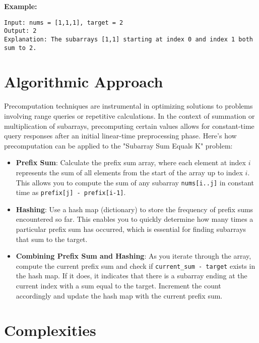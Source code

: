 \textbf{Example:}
\begin{verbatim}
Input: nums = [1,1,1], target = 2
Output: 2
Explanation: The subarrays [1,1] starting at index 0 and index 1 both sum to 2.
\end{verbatim}


\section*{Algorithmic Approach}

Precomputation techniques are instrumental in optimizing solutions to problems involving range queries or repetitive calculations. In the context of summation or multiplication of subarrays, precomputing certain values allows for constant-time query responses after an initial linear-time preprocessing phase. Here’s how precomputation can be applied to the "Subarray Sum Equals K" problem:

\begin{itemize}
    \item \textbf{Prefix Sum}: Calculate the prefix sum array, where each element at index \(i\) represents the sum of all elements from the start of the array up to index \(i\). This allows you to compute the sum of any subarray \texttt{nums[i..j]} in constant time as \texttt{prefix[j] - prefix[i-1]}.
    
    \item \textbf{Hashing}: Use a hash map (dictionary) to store the frequency of prefix sums encountered so far. This enables you to quickly determine how many times a particular prefix sum has occurred, which is essential for finding subarrays that sum to the target.
    
    \item \textbf{Combining Prefix Sum and Hashing}: As you iterate through the array, compute the current prefix sum and check if \texttt{current\_sum - target} exists in the hash map. If it does, it indicates that there is a subarray ending at the current index with a sum equal to the target. Increment the count accordingly and update the hash map with the current prefix sum.
\end{itemize}

\section*{Complexities}

